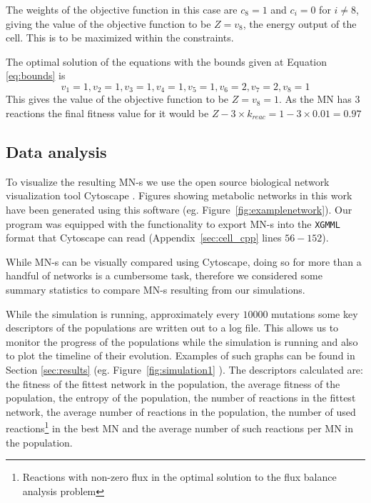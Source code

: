 \documentclass[a4paper,12pt]{article}
\begin{document}
	The weights of the objective function in this case are $c_8=1$ and $c_i=0$ for $i\neq 8$, giving the value of the objective function to be $Z=v_8$, the energy output of the cell. This is to be maximized within the constraints.

	The optimal solution of the equations with the bounds given at Equation \ref{eq:bounds} is 
	\begin{equation}\label{eq:solution}
		v_1=1 , v_2=1, v_3=1, v_4=1, v_5=1, v_6=2, v_7=2, v_8=1
	\end{equation}
	This gives the value of the objective function to be $Z=v_8=1$. As the MN has $3$ reactions the final fitness value for it would be $Z-3\times k_{reac}=1-3\times 0.01=0.97$
\subsection{Data analysis}
\label{sub:visualization}

To visualize the resulting MN-s we use the open source biological network visualization tool Cytoscape \cite{cytoscape}. Figures showing metabolic networks in this work have been generated using this software (eg. Figure~\ref{fig:examplenetwork}). Our program was equipped with the functionality to export MN-s into the \texttt{XGMML} format that Cytoscape can read (Appendix~\ref{sec:cell_cpp} lines $56-152$). 

While MN-s can be visually compared using Cytoscape, doing so for more than a handful of networks is a cumbersome task, therefore we considered some summary statistics to compare MN-s resulting from our simulations.

While the simulation is running, approximately every $10000$ mutations some key descriptors of the populations are written out to a log file. This allows us to monitor the progress of the populations while the simulation is running and also to plot the timeline of their evolution. Examples of such graphs can be found in Section \ref{sec:results} (eg. Figure~\ref{fig:simulation1} ). The descriptors calculated are: the fitness of the fittest network in the population, the average fitness of the population, the entropy of the population, the number of reactions in the fittest network, the average number of reactions in the population, the number of used reactions\footnote{Reactions with non-zero flux in the optimal solution to the flux balance analysis problem} in the best MN and the average number of such reactions per MN in the population. 
\end{document}

